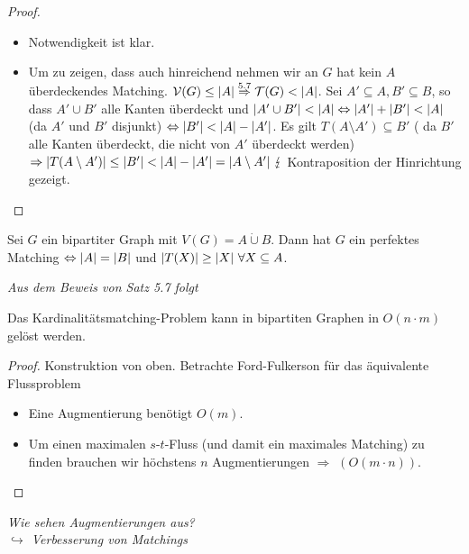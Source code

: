 \begin{proof}~
	\begin{itemize}
		\item Notwendigkeit ist klar.
		\item Um zu zeigen, dass auch hinreichend nehmen wir an $G$ hat kein $A$ überdeckendes Matching. $\mathcal{V}(G) \le \vert A \vert \overset{5.7}{\Rightarrow} \mathcal{T}(G) < \vert A \vert$. Sei $A' \subseteq A, B' \subseteq B$, so dass $A' \cup B'$ alle Kanten überdeckt und $\vert A' \cup B' \vert < \vert A \vert \Leftrightarrow \vert A' \vert + \vert B' \vert < \vert A \vert$ (da $A'$ und $B'$ disjunkt) $\Leftrightarrow \vert B' \vert < \vert A \vert - \vert A' \vert$. Es gilt $T(A\setminus A') \subseteq B'$ ( da $B'$ alle Kanten überdeckt, die nicht von $A'$ überdeckt werden) $\Rightarrow \vert T(A\setminus A') \vert \le \vert B' \vert < \vert A \vert - \vert A' \vert = \vert A\setminus A' \vert~\lightning$ Kontraposition der Hinrichtung gezeigt.
	\end{itemize}
\end{proof}
\begin{korollar}
	Sei $G$ ein bipartiter Graph mit $V(G) = A\dot\cup B$. Dann hat $G$ ein perfektes Matching $\Leftrightarrow \vert A \vert=\vert B \vert$ und $\vert T(X) \vert \ge \vert X \vert~\forall X \subseteq A$.
\end{korollar}
\textit{Aus dem Beweis von Satz 5.7 folgt}
\begin{korollar}
	Das Kardinalitätsmatching-Problem kann in bipartiten Graphen in $O(n\cdot m)$ gelöst werden.
\end{korollar}
\begin{proof}
	Konstruktion von oben. Betrachte Ford-Fulkerson für das äquivalente Flussproblem
	\begin{itemize}
		\item Eine Augmentierung benötigt $O(m)$.
		\item Um einen maximalen $s$-$t$-Fluss (und damit ein maximales Matching) zu finden brauchen wir höchstens $n$ Augmentierungen $\Rightarrow$ $(O(m\cdot n))$.
	\end{itemize}
\end{proof}
\textit{Wie sehen Augmentierungen aus?\\
\hspace*{10pt}$\hookrightarrow$ Verbesserung von Matchings}
